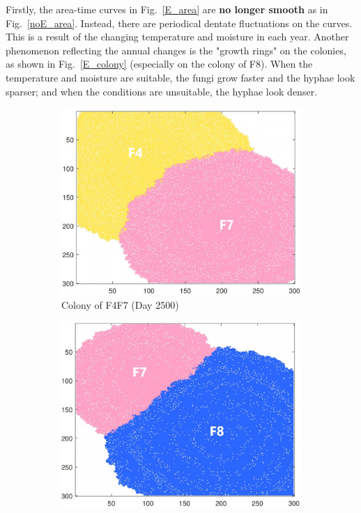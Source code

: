 \documentclass[a4paper,12pt]{article}
\begin{document}
\par Firstly, the area-time curves in Fig.~\ref{E_area} are \textbf{no longer smooth} as in Fig.~\ref{noE_area}. Instead, there are periodical dentate fluctuations on the curves. This is a result of the changing temperature and moisture in each year. Another phenomenon reflecting the annual changes is the "growth rings" on the colonies, as shown in Fig.~\ref{E_colony} (especially on the colony of F8). When the temperature and moisture are suitable, the fungi grow faster and the hyphae look sparser; and when the conditions are unsuitable, the hyphae look denser. 

	\begin{figure}[H]
		\centering 
		\begin{subfigure}{0.3\textwidth}
			\includegraphics[width=\textwidth]{./4/E_F4F7_2500.jpg}
			\caption{Colony of F4F7 (Day 2500)}
			\label{E_F4F7_2500}
		\end{subfigure}
		\begin{subfigure}{0.3\textwidth}
			\includegraphics[width=\textwidth]{./4/E_F7F8_1550.jpg}

\end{subfigure}
\end{figure}
\end{document}
